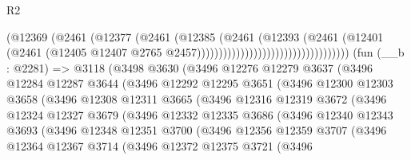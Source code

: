 \begin{lexlean}{R2}
\begin{coremodule}
                                                    (@12369
                                                      (@2461
                                                        (@12377
                                                          (@2461
                                                            (@12385
                                                              (@2461
                                                                (@12393
                                                                  (@2461
                                                                    (@12401
                                                                      (@2461
                                                                        (@12405
                                                                          @12407
                                                                          @2765
                                                                          @2457)))))))))))))))))))))))))))))))))))
    (fun (__b : @2281) =>
    @3118
      (@3498
        @3630
        (@3496
          @12276
          @12279
          @3637
          (@3496
            @12284
            @12287
            @3644
            (@3496
              @12292
              @12295
              @3651
              (@3496
                @12300
                @12303
                @3658
                (@3496
                  @12308
                  @12311
                  @3665
                  (@3496
                    @12316
                    @12319
                    @3672
                    (@3496
                      @12324
                      @12327
                      @3679
                      (@3496
                        @12332
                        @12335
                        @3686
                        (@3496
                          @12340
                          @12343
                          @3693
                          (@3496
                            @12348
                            @12351
                            @3700
                            (@3496
                              @12356
                              @12359
                              @3707
                              (@3496
                                @12364
                                @12367
                                @3714
                                (@3496
                                  @12372
                                  @12375
                                  @3721
                                  (@3496

\end{coremodule}
\end{lexlean}
